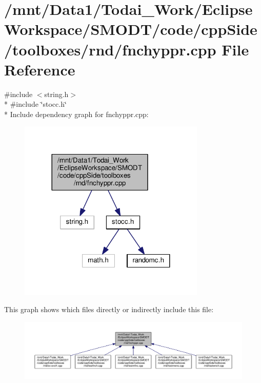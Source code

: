 \section{/mnt/\-Data1/\-Todai\-\_\-\-Work/\-Eclipse\-Workspace/\-S\-M\-O\-D\-T/code/cpp\-Side/toolboxes/rnd/fnchyppr.cpp File Reference}
\label{toolboxes_2rnd_2fnchyppr_8cpp}
{\ttfamily \#include $<$string.\-h$>$}\\*
{\ttfamily \#include \char`\"{}stocc.\-h\char`\"{}}\\*
Include dependency graph for fnchyppr.\-cpp\-:
\nopagebreak
\begin{figure}[H]
\begin{center}
\leavevmode
\includegraphics[width=252pt]{toolboxes_2rnd_2fnchyppr_8cpp__incl}
\end{center}
\end{figure}
This graph shows which files directly or indirectly include this file\-:
\nopagebreak
\begin{figure}[H]
\begin{center}
\leavevmode
\includegraphics[width=350pt]{toolboxes_2rnd_2fnchyppr_8cpp__dep__incl}
\end{center}
\end{figure}
